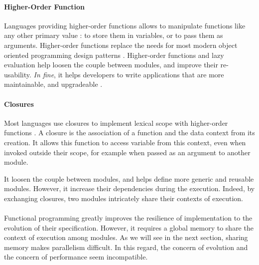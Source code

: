 \paragraph{Higher-Order Function}

Languages providing higher-order functions allows to manipulate functions like any other primary value : to store them in variables, or to pass them as arguments.
Higher-order functions replace the needs for most modern object oriented programming design patterns .
Higher-order functions and lazy evaluation help loosen the couple between modules, and improve their re-usability.
\textit{In fine}, it helps developers to write applications that are more maintainable, and upgradeable \cite{Hughes1989}.

\paragraph{Closures}

Most languages use closures to implement lexical scope with higher-order functions \cite{Sussman1998}.
A closure is the association of a function and the data context from its creation.
It allows this function to access variable from this context, even when invoked outside their scope, for example when passed as an argument to another module.

It loosen the couple between modules, and helps define more generic and reusable modules.
However, it increase their dependencies during the execution.
Indeed, by exchanging closures, two modules intricately share their contexts of execution.

\paragraph{}

Functional programming greatly improves the resilience of implementation to the evolution of their specification.
However, it requires a global memory to share the context of execution among modules.
As we will see in the next section, sharing memory makes parallelism difficult.
In this regard, the concern of evolution and the concern of performance seem incompatible.


\endinput



\subsubsection{Modularity based on Design Decisions}

